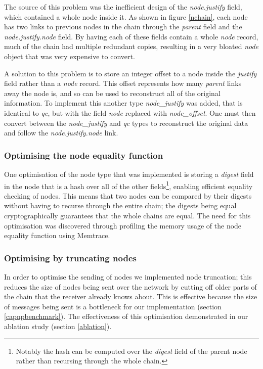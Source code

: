 The source of this problem was the inefficient design of the \textit{node.justify} field, which contained a whole node inside it. As shown in figure \ref{nchain}, each node has two links to previous nodes in the chain through the \textit{parent} field and the \textit{node.justify.node} field. By having each of these fields contain a whole \textit{node} record, much of the chain had multiple redundant copies, resulting in a very bloated \textit{node} object that was very expensive to convert.

A solution to this problem is to store an integer offset to a node inside the \textit{justify} field rather than a \textit{node} record. This offset represents how many \textit{parent} links away the node is, and so can be used to reconstruct all of the original information. To implement this another type \textit{node\_justify} was added, that is identical to \textit{qc}, but with the field \textit{node} replaced with \textit{node\_offset}. One must then convert between the \textit{node\_justify} and \textit{qc} types to reconstruct the original data and follow the \textit{node.justify.node} link.

\subsubsection{Optimising the node equality function} \label{equality}
One optimisation of the node type that was implemented is storing a \textit{digest} field in the node that is a hash over all of the other fields\footnote{Notably the hash can be computed over the \textit{digest} field of the parent node rather than recursing through the whole chain.}, enabling efficient equality checking of nodes. This means that two nodes can be compared by their digests without having to recurse through the entire chain; the digests being equal cryptographically guarantees that the whole chains are equal. The need for this optimisation was discovered through profiling the memory usage of the node equality function using Memtrace.

\subsubsection{Optimising by truncating nodes} \label{truncation}
In order to optimise the sending of nodes we implemented node truncation; this reduces the size of nodes being sent over the network by cutting off older parts of the chain that the receiver already knows about. This is effective because the size of messages being sent is a bottleneck for our implementation (section \ref{capnpbenchmark}). The effectiveness of this optimisation demonstrated in our ablation study (section \ref{ablation}).

